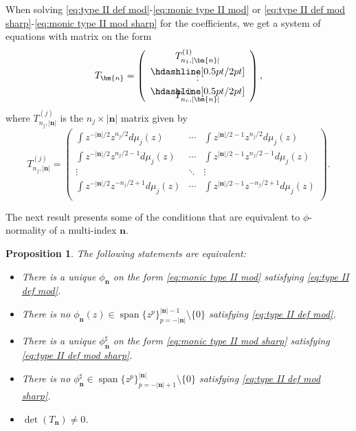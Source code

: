 \documentclass[reqno,centertags,11pt,draft]{amsart}
\newtheorem{prop}[thm]{Proposition}
\newcommand{\abs}[1]{\left|#1\right|}
\begin{document}
When solving \eqref{eq:type II def mod}-\eqref{eq:monic type II mod} or \eqref{eq:type II def mod sharp}-\eqref{eq:monic type II mod sharp} for the coefficients, we get a system of equations with matrix on the form
\begin{equation}\label{eq:moment matrix mod}
        T_{\bm{n}} =
        \left(\begin{array}{c}
            T^{(1)}_{n_1,|\bm{n}|} 
            \\[0.4em]
        \hdashline[0.5pt/2pt]
        \\[-1.2em]
         \vdots \\[0.2em]
        \hdashline[0.5pt/2pt]
        \\[-1.0em]
            T^{(r)}_{n_r,|\bm{n}|}
        \end{array}
        \right),
    \end{equation}
where $T^{(j)}_{n_j,|\bm{n}|}$ is the $n_j\times |\bm{n}|$ matrix given by
    \begin{equation}\label{eq:H1}
         T^{(j)}_{n_j,|\bm{n}|} =
         \begin{pmatrix}
            \int z^{-\abs{\bm{n}}/2}z^{n_j/2} d\mu_j(z) & \cdots & \int z^{\abs{\bm{n}}/2-1}z^{n_j/2} d\mu_j(z) \\
            \int z^{-\abs{\bm{n}}/2}z^{n_j/2-1} d\mu_j(z) & \cdots & \int z^{\abs{\bm{n}}/2-1}z^{n_j/2-1} d\mu_j(z) \\
            \vdots & \ddots & \vdots \\ 
            \int z^{-\abs{\bm{n}}/2}z^{-n_j/2+1} d\mu_j(z) & \cdots & \int z^{\abs{\bm{n}}/2-1}z^{-n_j/2+1} d\mu_j(z) \\
        \end{pmatrix}.
    \end{equation}

The next result presents some of the  conditions that are equivalent to $\phi$-normality of a multi-index $\bm{n}$.
\begin{prop}\label{prop:phi normality criteria}
    The following statements are equivalent:
    \begin{itemize}
        \item There is a unique $\phi_{\bm{n}}$ on the form \eqref{eq:monic type II mod} satisfying \eqref{eq:type II def mod}.
        \item There is no $\phi_{\bm{n}}(z) \in \operatorname{span}\{z^p\}_{p = -\abs{\bm{n}}}^{\abs{\bm{n}}-1}\setminus\{0\}$ satisfying \eqref{eq:type II def mod}.
        \item There is a unique $\phi_{\bm{n}}^\sharp$ on the form \eqref{eq:monic type II mod sharp} satisfying \eqref{eq:type II def mod sharp}.
        \item There is no $\phi_{\bm{n}}^\sharp \in \operatorname{span}\{z^p\}_{p = -\abs{\bm{n}}+1}^{\abs{\bm{n}}}\setminus\{0\}$ satisfying \eqref{eq:type II def mod sharp}.
        \item $\det(T_{\bm{n}}) \neq 0$. 
    \end{itemize}
\end{prop}
\end{document}
